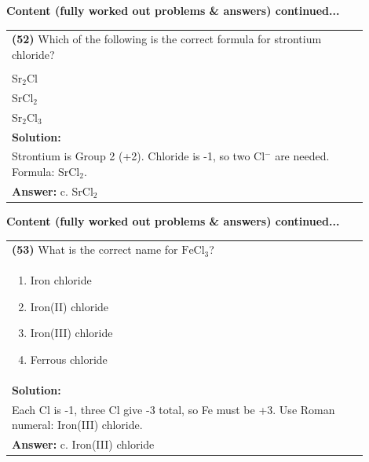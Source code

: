 \documentclass{article}
\begin{document}
{\newpage
\noindent
{\large\textbf{Content (fully worked out problems \& answers) continued...}}\\[0.2em]

\begin{tabular}{|p{0.9\linewidth}|}
\hline
\vspace{0.2cm}
\textbf{(52)} Which of the following is the correct formula for strontium chloride? \\
\begin{minipage}[t]{0.85\linewidth}
\begin{enumerate}[label=\alph*.]
\item SrCl \\
\item Sr$_2$Cl \\
\item SrCl$_2$ \\
\item Sr$_2$Cl$_3$
\end{enumerate}
\end{minipage}\\
\hline
\vspace{0.2cm}
\textbf{Solution:} \\
Strontium is Group 2 (+2). Chloride is -1, so two Cl$^{-}$ are needed. Formula: SrCl$_2$. \\
\hline
\vspace{0.2cm}
\textbf{Answer:} c. SrCl$_2$ \\
\hline
\end{tabular}
\newpage
\noindent
{\large\textbf{Content (fully worked out problems & answers) continued...}}\\[0.2em]
\vspace{0.2cm}
\begin{tabular}{|p{0.9\linewidth}|}
\hline
\vspace{0.2cm}
\textbf{(53)} What is the correct name for $\text{FeCl}_3$? \\
\begin{minipage}[t]{0.85\linewidth}
\begin{enumerate}[label=\alph*.]
\item Iron chloride \
\item Iron(II) chloride \
\item Iron(III) chloride \
\item Ferrous chloride
\end{enumerate}
\end{minipage}\\
\hline
\vspace{0.2cm}
\textbf{Solution:} \\
Each Cl is -1, three Cl give -3 total, so Fe must be +3. Use Roman numeral: Iron(III) chloride. \\
\hline
\vspace{0.2cm}
\textbf{Answer:} c. Iron(III) chloride \
\hline
\end{tabular}

}
\end{document}
